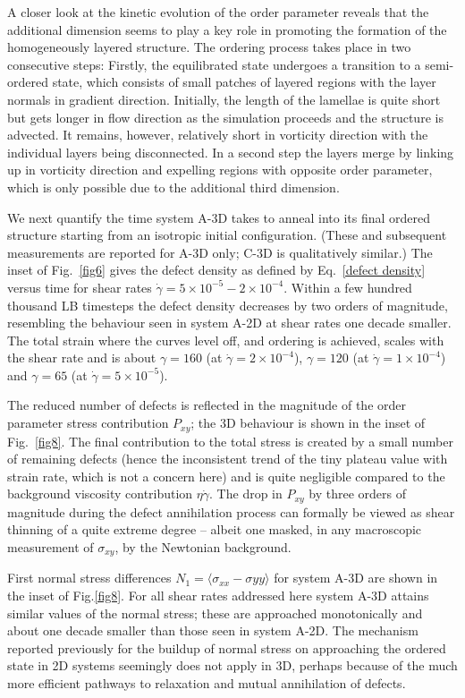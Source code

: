 \documentclass[8.5pt,twoside,twocolumn]{article}
\begin{document}
A closer look at the kinetic evolution of the order parameter reveals that the additional dimension seems to play a key role in promoting the formation of the homogeneously layered structure.
The ordering process takes place in two consecutive steps: 
Firstly, the equilibrated state undergoes a transition to a semi-ordered state, which consists of small patches of layered regions with the layer normals in gradient direction.
Initially, the length of the lamellae is quite short but gets longer in flow direction as the simulation proceeds and the structure is advected.
It remains, however, relatively short in vorticity direction with the individual layers being disconnected.
In a second step the layers merge by linking up in vorticity direction and expelling regions with opposite order parameter, which is only possible due to the additional third dimension.

We next quantify the time system A-3D takes to anneal into its final ordered structure starting from an isotropic initial configuration. (These and subsequent measurements are reported for A-3D only; C-3D is qualitatively similar.)  
The inset of Fig.~\ref{fig6} gives the defect density as defined by Eq.~\ref{defect density} versus time for shear rates $\dot{\gamma}=5\times10^{-5}-2\times10^{-4}$. 
Within a few hundred thousand LB timesteps the defect density decreases by two orders of magnitude, resembling the behaviour seen in system A-2D at shear rates one decade smaller.
The total strain where the curves level off, and ordering is achieved, scales with the shear rate and is about $\gamma=160$ (at $\dot{\gamma}=2\times10^{-4}$), $\gamma=120$ (at $\dot{\gamma}=1\times10^{-4}$) and $\gamma=65$ (at $\dot{\gamma}=5\times10^{-5}$).

The reduced number of defects is reflected in the magnitude of the order parameter stress contribution $P_{xy}$; the 3D behaviour is shown in the inset of Fig.~\ref{fig8}. The final contribution to the total stress is created by a small number of remaining defects (hence the inconsistent trend of the tiny plateau value with strain rate, which is not a concern here) and is quite negligible compared to the background viscosity contribution $\eta\dot\gamma$. The drop in $P_{xy}$ by three orders of magnitude during the defect annihilation process can formally be viewed as shear thinning of a quite extreme degree -- albeit one masked, in any macroscopic measurement of $\sigma_{xy}$, by the Newtonian background. 

First normal stress differences $N_1=\langle\sigma_{xx}-\sigma{yy}\rangle$ for system A-3D are shown in the inset of Fig.\ref{fig8}.
For all shear rates addressed here system A-3D attains similar values of the normal stress; these are approached monotonically and about one decade smaller than those seen in system A-2D. The mechanism reported previously for the buildup of normal stress on approaching the ordered state in 2D systems seemingly does not apply in 3D, perhaps because of the much more efficient pathways to relaxation and mutual annihilation of defects.
\end{document}
